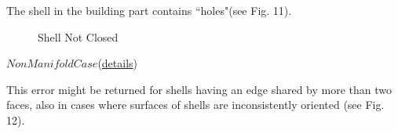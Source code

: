 \documentclass[12pt]{article}
\begin{document}
The shell in the building part contains ``holes"(see Fig. 11).
\begin{figure}[htbp]
\centering
{}
\caption{Shell Not Closed}
\end{figure}

$Non Manifold Case$(\href{https://val3dity.readthedocs.io/en/latest/errors/#non-manifold-case}{details})

This error might be returned for shells having an edge shared by more than two faces, also in cases where surfaces of shells are inconsistently oriented (see Fig. 12).
\end{document}
